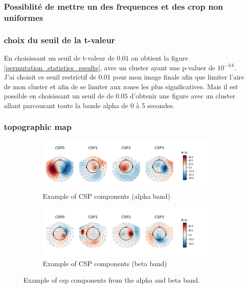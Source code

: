 \subsubsection{Possiblité de mettre un des frequences et des crop non uniformes}

\subsubsection{choix du seuil de la t-valeur}
En choisissant un seuil de t-valeur de $0.01$ on obtient la figure \ref{permutation_statistics_results}, avec un cluster ayant une p-valuer de $10^{-3.6}$. J'ai choisit ce seuil restrictif de 0.01 pour mon image finale afin que limiter l'aire de mon cluster et afin de se limiter aux zones les plus significatives. Mais il est possible en choisissant un seuil de de $0.05$ d'obtenir une figure avec un cluster allant parcourant toute la bande alpha de 0 à 5 secondes.

\subsubsection{topographic map}

\begin{figure}
    \centering
    \begin{subfigure}[b]{0.55\textwidth}
       \includegraphics[width=1\linewidth]{images_report/sensor/csp_individual/sub_155_alpha.png}
       \caption{Example of CSP components (alpha band)}
       \label{fig:csp_component_alpha_band}
    \end{subfigure}
    
    \begin{subfigure}[b]{0.55\textwidth}
       \includegraphics[width=1\linewidth]{images_report/sensor/csp_individual/sub_215_beta.png}
       \caption{Example of CSP components (beta band)}
       \label{fig:csp_component_beta_band}
    \end{subfigure}

    \caption[Example of csp components from the alpha and beta band.]%
    {Example of csp components from the alpha and beta band.}
    \label{example_csp_component}
\end{figure}

